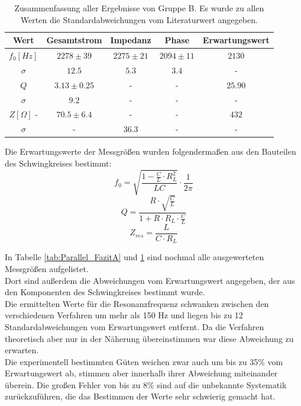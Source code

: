 \documentclass[12pt,a4paper]{article}
\begin{document}
\begin{table}[h]
\centering
\begin{tabular}{|c|c|c|c|c|}
\hline
Wert & Gesamtstrom & Impedanz & Phase & Erwartungswert\\
\hline
\hline
$f_0[Hz]$ & $2278\pm 39$ & $2275\pm 21$ & $2094\pm 11$ & $2130$\\
\hline
$\sigma$ & $12.5$ & $5.3$ & $3.4$ & -\\
\hline
\hline
$Q$ & $3.13\pm 0.25$ &  - & - & $25.90$\\
\hline
$\sigma$ & $9.2$ &  - & - & -\\
\hline
\hline
$Z[\Omega]$ - & $70.5\pm 6.4$ & - &  - &$432$\\
\hline
$\sigma$ & - & $36.3$ & - & -\\
\hline
\end{tabular}
\caption{Zusammenfassung aller Ergebnisse von Gruppe B. Es wurde zu allen Werten die Standardabweichungen vom Literaturwert angegeben.}
\label{tab:Parallel_FazitB}
\end{table}

Die Erwartungswerte der Messgrößen wurden folgendermaßen aus den Bauteilen des Schwingkreises bestimmt:
\begin{equation}
f_0 = \sqrt{\dfrac{1-\frac{C}{L}\cdot R_L^{2}}{LC}}\cdot \dfrac{1}{2\pi}
\end{equation}
\begin{equation}
Q = \dfrac{R\cdot \sqrt{\frac{C}{L}}}{1+R\cdot R_L\cdot \frac{C}{L}}
\end{equation}
\begin{equation}
Z_{res} = \dfrac{L}{C\cdot R_L}
\end{equation}

In Tabelle \ref{tab:Parallel_FazitA} und \ref{tab:Parallel_FazitB} sind nochmal alle ausgewerteten Messgrößen aufgelistet.\\
Dort sind außerdem die Abweichungen vom Erwartungswert angegeben, der aus den Komponenten des Schwingkreises bestimmt wurde.\\
Die ermittelten Werte für die Resonanzfrequenz schwanken zwischen den verschiedenen Verfahren um mehr als 150 Hz und liegen bis zu 12 Standardabweichungen vom Erwartungswert entfernt. Da die Verfahren theoretisch aber nur in der Näherung übereinstimmen war diese Abweichung zu erwarten.\\
Die experimentell bestimmten Güten weichen zwar auch um bis zu 35\% vom Erwartungswert ab, stimmen aber innerhalb ihrer Abweichung miteinander überein. Die großen Fehler von bis zu 8\% sind auf die unbekannte Systematik zurückzuführen, die das Bestimmen der Werte sehr schwierig gemacht hat.
\end{document}
